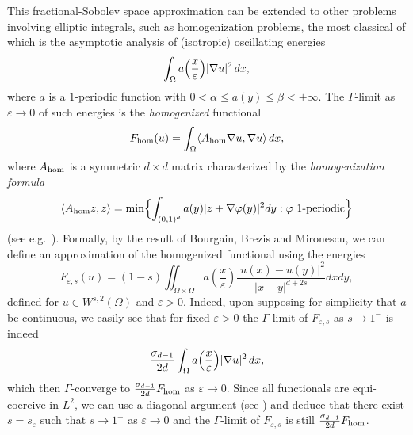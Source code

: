 \documentclass[11pt,a4paper,reqno]{amsart}
\theoremstyle{plain}
\theoremstyle{definition}
\newcommand\e{\varepsilon}
\theoremstyle{remark}
\begin{document}
This fractional-Sobolev space approximation can be extended to other problems involving elliptic integrals, such as homogenization problems, the most classical of which is the asymptotic analysis of (isotropic) oscillating energies
\begin{equation}\label{oscillating}
\int_\Omega a\Bigl(\frac{x}{\e}\Bigr)|\nabla u|^2\,dx,
\end{equation}
where $a$ is a $1$-periodic function with $0<\alpha\le a(y)\le \beta<+\infty$. The $\Gamma$-limit as $\e\to 0$ of such energies is the {\em homogenized} functional
$$
F_{\rm hom}(u)=\int_\Omega\langle A_{\rm hom}\nabla u,\nabla u\rangle\,dx,
$$
where $A_{\rm hom}$ is a symmetric $d\times d$ matrix characterized by the {\em homogenization formula}
\begin{equation}\label{homfor}
\langle A_{\rm hom}z,z\rangle=\min\Bigl\{\int_{(0,1)^d} a(y)|z+\nabla \varphi(y)|^2dy: \varphi\  1\hbox{-periodic}\Bigr\}
\end{equation}
(see e.g.~\cite{BDF}).
Formally, by the result of Bourgain, Brezis and Mironescu, we can define an approximation of the homogenized functional using the energies
\begin{equation}\label{functional-0}
    F_{\varepsilon,s}(u)=(1-s)\iint_{\Omega\times \Omega} a\left(\frac{x}{\varepsilon}\right)\frac{\lvert u(x)-u(y)\rvert^2}{\lvert x-y\rvert^{d+2s}}dxdy,
\end{equation}
defined for $u\in W^{s,2}(\Omega)$ and $\e>0$. Indeed, upon supposing for simplicity that $a$ be continuous, we easily see that for fixed $\e>0$ the $\Gamma$-limit of $F_{\varepsilon,s}$ as $s\to 1^-$ is indeed 
$$
\frac{\sigma_{d-1}}{2d}\int_\Omega a\Bigl(\frac{x}{\e}\Bigr) |\nabla u|^2\,dx,
$$
which then $\Gamma$-converge to $\frac{\sigma_{d-1}}{2d} F_{\rm hom}$ as $\e\to0$.
Since all functionals are equi-coercive in $L^2$, we can use a diagonal argument (see \cite{DalMaso}) and deduce that there exist $s=s_\e$ such that $s\to 1^-$ as $\e\to0$ and the $\Gamma$-limit of $F_{\e,s}$ is still $\frac{\sigma_{d-1}}{2d} F_{\rm hom}$. 
\end{document}
